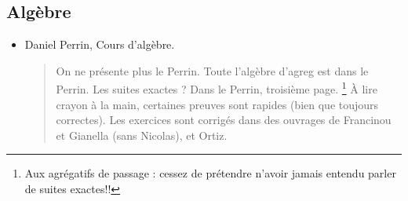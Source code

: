 \documentclass{article}
\begin{document}
\subsection{Algèbre}
\begin{mdframed}
\begin{itemize}
\item Daniel Perrin, Cours d'algèbre.
\begin{quote}
On ne présente plus \og le Perrin\fg. Toute l'algèbre d'agreg est \og dans le Perrin\fg. Les suites exactes ? Dans le Perrin, troisième page. \footnote{Aux agrégatifs de passage : cessez de prétendre n'avoir jamais entendu parler de suites exactes!!} À lire crayon à la main, certaines preuves sont rapides (bien que toujours correctes). Les exercices sont corrigés dans des ouvrages de Francinou et Gianella (sans Nicolas), et Ortiz.
\end{quote}
\end{itemize}
\end{mdframed}
\end{document}
